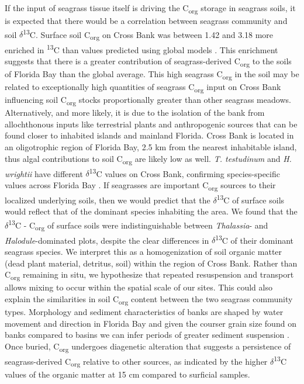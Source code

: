 If the input of seagrass tissue itself is driving the C\textsubscript{org} storage in seagrass soils, it is expected that there would be a correlation between seagrass community and soil $\delta$\textsuperscript{13}C. Surface soil C\textsubscript{org} on Cross Bank was between 1.42 \textperthousand{} and 3.18 \textperthousand{} more enriched in \textsuperscript{13}C than values predicted using global models \citep{Kennedy:2010if}. This enrichment suggests that there is a greater contribution of seagrass-derived C\textsubscript{org} to the soils of Florida Bay than the global average. This high seagrass C\textsubscript{org} in the soil may be related to exceptionally high quantities of seagrass C\textsubscript{org} input on Cross Bank influencing soil C\textsubscript{org} stocks proportionally greater than other seagrass meadows. Alternatively, and more likely, it is due to the isolation of the bank from allochthonous inputs like terrestrial plants and anthropogenic sources that can be found closer to inhabited islands and mainland Florida. Cross Bank is located in an oligotrophic region of Florida Bay, 2.5 km from the nearest inhabitable island, thus algal contributions to soil C\textsubscript{org} are likely low as well. \textit{T. testudinum} and \textit{H. wrightii} have different $\delta$\textsuperscript{13}C values on Cross Bank, confirming species-specific values across Florida Bay \citep{Campbell:2009fi}. If seagrasses are important C\textsubscript{org} sources to their localized underlying soils, then we would predict that the $\delta$\textsuperscript{13}C of surface soils would reflect that of the dominant species inhabiting the area. We found that the $\delta$\textsuperscript{13}C - C\textsubscript{org} of surface soils were indistinguishable between \textit{Thalassia}- and \textit{Halodule}-dominated plots, despite the clear differences in $\delta$\textsuperscript{13}C of their dominant seagrass species. We interpret this as a homogenization of soil organic matter (dead plant material, detritus, soil) within the region of Cross Bank. Rather than C\textsubscript{org} remaining in situ, we hypothesize that repeated resuspension and transport allows mixing to occur within the spatial scale of our sites. This could also explain the similarities in soil C\textsubscript{org} content between the two seagrass community types. Morphology and sediment characteristics of banks are shaped by water movement and direction in Florida Bay and given the courser grain size found on banks compared to basins we can infer periods of greater sediment suspension \citep{Bosence:1989tx}. Once buried, C\textsubscript{org} undergoes diagenetic alteration that suggests a persistence of seagrass-derived C\textsubscript{org} relative to other sources, as indicated by the higher $\delta$\textsuperscript{13}C values of the organic matter at 15 cm compared to surficial samples.

